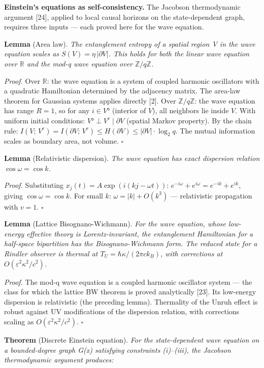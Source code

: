 \documentclass[
  11pt,
]{article}
\begin{document}
\textbf{Einstein's equations as self-consistency.} The Jacobson
thermodynamic argument {[}24{]}, applied to local causal horizons on the
state-dependent graph, requires three inputs --- each proved here for
the wave equation.

\textbf{Lemma} (Area law). \emph{The entanglement entropy of a spatial
region V in the wave equation scales as \(S(V) = \eta\,|\partial V|\).
This holds for both the linear wave equation over \(\mathbb{R}\) and the
mod-q wave equation over \(\mathbb{Z}/q\mathbb{Z}\).}

\emph{Proof.} Over \(\mathbb{R}\): the wave equation is a system of
coupled harmonic oscillators with a quadratic Hamiltonian determined by
the adjacency matrix. The area-law theorem for Gaussian systems applies
directly {[}2{]}. Over \(\mathbb{Z}/q\mathbb{Z}\): the wave equation has
range \(R = 1\), so for any \(i \in V°\) (interior of \(V\)), all
neighbors lie inside \(V\). With uniform initial conditions:
\(V° \perp V^c \mid \partial V\) (spatial Markov property). By the chain
rule:
\(I(V;\, V^c) = I(\partial V;\, V^c) \leq H(\partial V) \leq |\partial V| \cdot \log_2 q\).
The mutual information scales as boundary area, not volume. \(\square\)

\textbf{Lemma} (Relativistic dispersion). \emph{The wave equation has
exact dispersion relation \(\cos\omega = \cos k\).}

\emph{Proof.} Substituting \(x_j(t) = A\exp(i(kj - \omega t))\):
\(e^{-i\omega} + e^{i\omega} = e^{-ik} + e^{ik}\), giving
\(\cos\omega = \cos k\). For small \(k\): \(\omega = |k| + O(k^3)\) ---
relativistic propagation with \(v = 1\). \(\square\)

\textbf{Lemma} (Lattice Bisognano-Wichmann). \emph{For the wave
equation, whose low-energy effective theory is Lorentz-invariant, the
entanglement Hamiltonian for a half-space bipartition has the
Bisognano-Wichmann form. The reduced state for a Rindler observer is
thermal at \(T_U = \hbar\kappa/(2\pi c k_B)\), with corrections at
\(O(\varepsilon^2\kappa^2/c^2)\).}

\emph{Proof.} The mod-q wave equation is a coupled harmonic oscillator
system --- the class for which the lattice BW theorem is proved
analytically {[}23{]}. Its low-energy dispersion is relativistic (the
preceding lemma). Thermality of the Unruh effect is robust against UV
modifications of the dispersion relation, with corrections scaling as
\(O(\varepsilon^2\kappa^2/c^2)\). \(\square\)

\textbf{Theorem} (Discrete Einstein equation). \emph{For the
state-dependent wave equation on a bounded-degree graph G(x) satisfying
constraints (i)--(iii), the Jacobson thermodynamic argument produces:}
\end{document}
